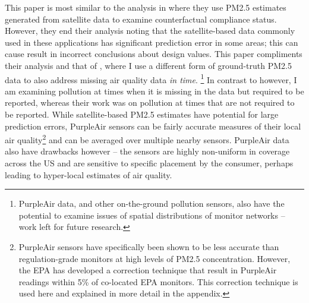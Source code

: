 This paper is most similar to the analysis in \cite{fowlieBringingSatelliteBasedAir2019} where they use PM2.5 estimates generated from satellite data to examine counterfactual compliance status.
%
However, they end their analysis noting that the satellite-based data commonly used in these applications has significant prediction error in some areas; this can cause result in incorrect conclusions about design values.
This paper compliments their analysis and that of \citeauthor{muWhatMissingEnvironmental2021}, where I use a different form of ground-truth PM2.5 data to also address missing air quality data \textit{in time}. \footnote{PurpleAir data, and other on-the-ground pollution sensors, also have the potential to examine issues of spatial distributions of monitor networks -- work left for future research.} In contrast to \citeauthor{muWhatMissingEnvironmental2021} however, I am examining pollution at times when it is missing in the data but required to be reported, whereas their work was on pollution at times that are not required to be reported.
%
While satellite-based PM2.5 estimates have potential for large prediction errors, PurpleAir sensors can be fairly accurate measures of their local air quality\footnote{PurpleAir sensors have specifically been shown to be less accurate than regulation-grade monitors at high levels of PM2.5 concentration. 
However, the EPA has developed a correction technique that result in PurpleAir readings within 5\% of co-located EPA monitors. 
This correction technique is used here and explained in more detail in the appendix.} and can be averaged over multiple nearby sensors.
%
PurpleAir data also have drawbacks however -- the sensors are highly non-uniform in coverage across the US and are sensitive to specific placement by the consumer, perhaps leading to hyper-local estimates of air quality.

